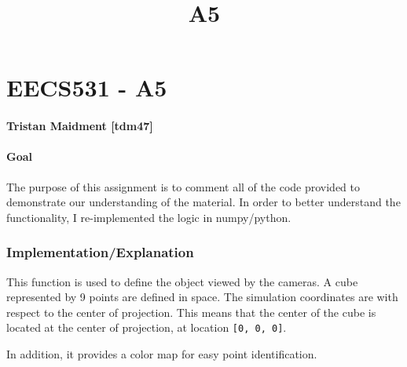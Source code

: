 \documentclass[11pt]{article}
\title{A5}
\begin{document}
    
    
    \maketitle
    
    

    
    \hypertarget{eecs531---a5}{%
\section{EECS531 - A5}\label{eecs531---a5}}

\hypertarget{tristan-maidment-tdm47}{%
\paragraph{Tristan Maidment {[}tdm47{]}}\label{tristan-maidment-tdm47}}

\hypertarget{goal}{%
\paragraph{Goal}\label{goal}}

The purpose of this assignment is to comment all of the code provided to
demonstrate our understanding of the material. In order to better
understand the functionality, I re-implemented the logic in
numpy/python.

\hypertarget{implementationexplanation}{%
\subsubsection{Implementation/Explanation}\label{implementationexplanation}}

    This function is used to define the object viewed by the cameras. A cube
represented by 9 points are defined in space. The simulation coordinates
are with respect to the center of projection. This means that the center
of the cube is located at the center of projection, at location
\texttt{{[}0,\ 0,\ 0{]}}.

In addition, it provides a color map for easy point identification.
\end{document}
